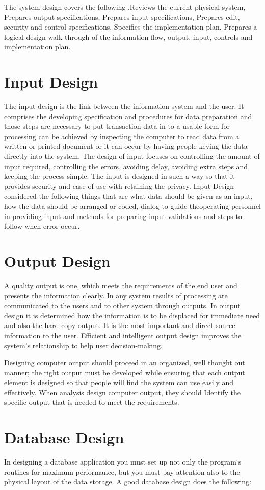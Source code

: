 The system design covers the following ,Reviews the current physical system,  Prepares output specifications, Prepares input specifications,  Prepares edit, security and control specifications,  Specifies the implementation plan,  Prepares a logical design walk through of the information flow, output, input, controls  and implementation plan. 
%
\section{Input Design}
The input design is the link between the information system and the user. It comprises the developing specification and procedures for data preparation and those steps are necessary to put transaction data in to a usable form for processing can be achieved by inspecting the computer to read data from a written or printed document or it can occur by having people keying the data directly into the system. The design of input focuses on controlling the amount of input required, controlling the errors, avoiding delay, avoiding extra steps and keeping the process simple. The input is designed in such a way so that it provides security and ease of use with retaining the privacy. Input Design considered the following things that are what data should be given as an input, how the data should be arranged or coded, dialog to guide theoperating personnel in providing input and methods for preparing input validations and steps to follow when error occur.
%
\section{Output Design}
A quality output is one, which meets the requirements of the end user and presents the information clearly. In any system results of processing are communicated to the users and to other system through outputs. In output design it is determined how the information is to be displaced for immediate need and also the hard copy output. It is the most important and direct source information to the user. Efficient and intelligent output design improves the system’s relationship to help user decision-making.

Designing computer output should proceed in an organized, well thought out manner; the right output must be developed while ensuring that each output element is designed so that people will find the system can use easily and effectively. When analysis design computer output, they should Identify the specific output that is needed to meet the requirements.
%
\section{Database Design}
In designing a database application you must set up not only the program‘s routines for maximum performance, but you must pay attention also to the physical layout of the data storage. A good database design does the following:

